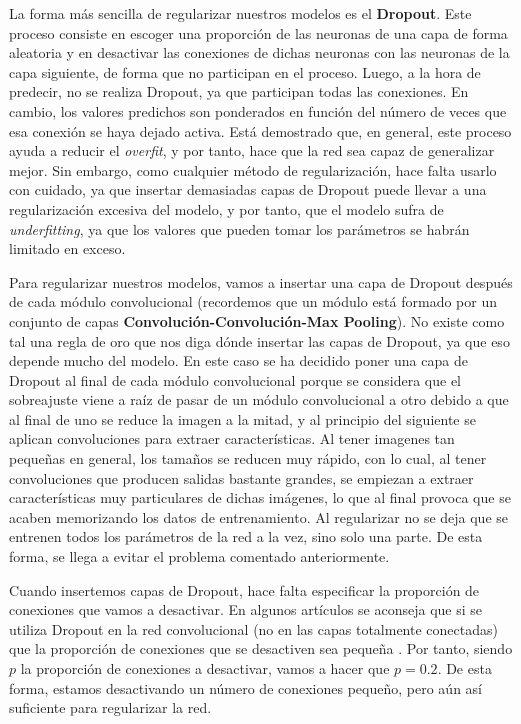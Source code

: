 \documentclass[11pt,a4paper]{article}
\begin{document}
La forma más sencilla de regularizar nuestros modelos es el \textbf{Dropout}. Este proceso consiste en escoger una proporción
de las neuronas de una capa de forma aleatoria y en desactivar las conexiones de dichas neuronas con las neuronas
de la capa siguiente, de forma que no participan en el proceso. Luego, a la hora de predecir, no se realiza Dropout, ya
que participan todas las conexiones. En cambio, los valores predichos son ponderados en función del número de veces que
esa conexión se haya dejado activa. Está demostrado que, en general, este proceso ayuda a reducir el \textit{overfit},
y por tanto, hace que la red sea capaz de generalizar mejor. Sin embargo, como cualquier método de regularización,
hace falta usarlo con cuidado, ya que insertar demasiadas capas de Dropout puede llevar a una regularización excesiva
del modelo, y por tanto, que el modelo sufra de \textit{underfitting}, ya que los valores que pueden tomar los parámetros
se habrán limitado en exceso.

Para regularizar nuestros modelos, vamos a insertar una capa de Dropout después de cada módulo convolucional (recordemos que
un módulo está formado por un conjunto de capas \textbf{Convolución-Convolución-Max Pooling}). No existe como tal una regla de
oro que nos diga dónde insertar las capas de Dropout, ya que eso depende mucho del modelo. En este caso se ha decidido
poner una capa de Dropout al final de cada módulo convolucional porque se considera que el sobreajuste viene a raíz de pasar
de un módulo convolucional a otro debido a que al final de uno se reduce la imagen a la mitad, y al principio del siguiente
se aplican convoluciones para extraer características. Al tener imagenes tan pequeñas en general, los tamaños se reducen muy
rápido, con lo cual, al tener convoluciones que producen salidas bastante grandes, se empiezan a extraer
características muy particulares de dichas imágenes, lo que al final provoca que se acaben memorizando los datos de entrenamiento.
Al regularizar no se deja que se entrenen todos los parámetros de la red a la vez, sino solo una parte. De esta forma,
se llega a evitar el problema comentado anteriormente.

Cuando insertemos capas de Dropout, hace falta especificar la proporción de conexiones que vamos a desactivar. En algunos
artículos se aconseja que si se utiliza Dropout en la red convolucional (no en las capas totalmente conectadas) que
la proporción de conexiones que se desactiven sea pequeña \cite{inproceedings}. Por tanto, siendo $p$ la proporción
de conexiones a desactivar, vamos a hacer que $p = 0.2$. De esta forma, estamos desactivando un número de conexiones
pequeño, pero aún así suficiente para regularizar la red.
\end{document}
